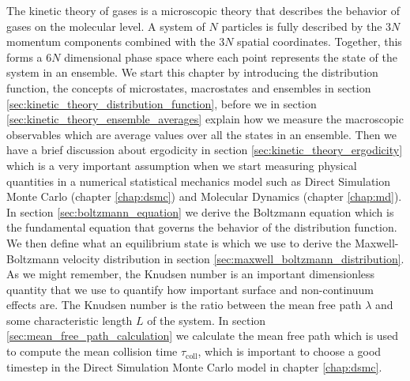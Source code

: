 The kinetic theory of gases is a microscopic theory that describes the behavior of gases on the molecular level. A system of $N$ particles is fully described by the $3N$ momentum components combined with the $3N$ spatial coordinates. Together, this forms a $6N$ dimensional phase space where each point represents the state of the system in an ensemble. We start this chapter by introducing the distribution function, the concepts of microstates, macrostates and ensembles in section \ref{sec:kinetic_theory_distribution_function}, before we in section \ref{sec:kinetic_theory_ensemble_averages} explain how we measure the macroscopic observables which are average values over all the states in an ensemble. Then we have a brief discussion about ergodicity in section \ref{sec:kinetic_theory_ergodicity} which is a very important assumption when we start measuring physical quantities in a numerical statistical mechanics model such as Direct Simulation Monte Carlo (chapter \ref{chap:dsmc}) and Molecular Dynamics (chapter \ref{chap:md}). In section \ref{sec:boltzmann_equation} we derive the Boltzmann equation which is the fundamental equation that governs the behavior of the distribution function. We then define what an equilibrium state is which we use to derive the Maxwell-Boltzmann velocity distribution in section \ref{sec:maxwell_boltzmann_distribution}. As we might remember, the Knudsen number is an important dimensionless quantity that we use to quantify how important surface and non-continuum effects are. The Knudsen number is the ratio between the mean free path $\lambda$ and some characteristic length $L$ of the system. In section \ref{sec:mean_free_path_calculation} we calculate the mean free path which is used to compute the mean collision time $\tau_\text{coll}$, which is important to choose a good timestep in the Direct Simulation Monte Carlo model in chapter \ref{chap:dsmc}.
